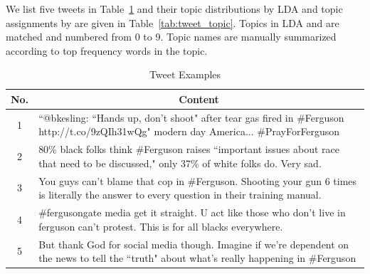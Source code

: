 We list five tweets in Table~\ref{tab:tweets} and their topic distributions by LDA and topic assignments by \stlda are given in Table~\ref{tab:tweet_topic}. Topics in LDA and \stlda are matched and numbered from 0 to 9. Topic names are manually summarized according to top frequency words in the topic.

\begin{table}[htpb]
\centering
\begin{tabular}{|c|p{14cm}|}
\hline
\bf No. & \multicolumn{1}{c|}{\bf Content}\\ \hline
1 & ``@bkesling: ``Hands up, don't shoot" after tear gas fired in \#Ferguson http://t.co/9zQIh31wQg" modern day America...  \#PrayForFerguson\\ \hline
2 & 80\% black folks think \#Ferguson raises ``important issues about race that need to be discussed," only 37\% of white folks do. Very sad.\\ \hline
3 & You guys can't blame that cop in \#Ferguson. Shooting your gun 6 times is literally the answer to every question in their training manual.\\ \hline
4 & \#fergusongate media get it straight. U act like those who don't live in ferguson can't protest. This is for all blacks everywhere.\\ \hline
5 & But thank God for social media though. Imagine if we're dependent on the news to tell the ``truth" about what's really happening in \#Ferguson\\ \hline
\end{tabular}
\caption{Tweet Examples}\label{tab:tweets}
\end{table}

